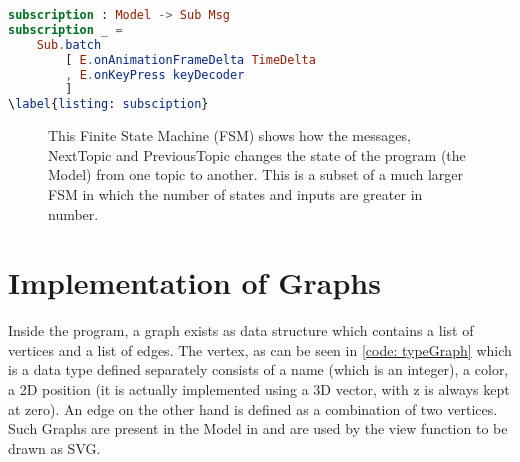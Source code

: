 \begin{lstlisting}[language=elm
                  , caption={
                            Subscription of Animation clock and Key presses services.
                            Subscriptions are used to catch the events which are
                            emanated outside the DOM. In this code, a system clock
                            and key presses are subscribed to by the program.
                            }
                  ]
subscription : Model -> Sub Msg
subscription _ =
    Sub.batch
        [ E.onAnimationFrameDelta TimeDelta
        , E.onKeyPress keyDecoder
        ]
\label{listing: subsciption}
\end{lstlisting}

\begin{figure}[h] %
\centering %
\caption{This Finite State Machine (FSM) 
        shows how the messages, NextTopic and PreviousTopic
        changes the state of the program (the Model) from
        one topic to another. This is a subset of a much larger
        FSM in which the number of states and inputs are greater
        in number.
        }
\label{fig:my_label}
\end{figure}
\section{Implementation of Graphs}
Inside the program, a graph exists as data structure which contains a list of
vertices and a list of edges. The vertex, as can be seen in \autoref{code:
typeGraph} which is a data type defined separately consists of a name (which is
an integer), a color, a 2D position (it is actually implemented using a 3D
vector, with z is always kept at zero).  An edge on the other hand is defined
as a combination of two vertices. Such Graphs are present in the Model in and
are used by the view function to be drawn as SVG.

